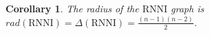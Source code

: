 \documentclass{amsart}
\newcommand{\rank}{\mathrm{rank}}
\newcommand{\nni}{\mathrm{NNI}}
\newcommand{\rnni}{\mathrm{RNNI}}
\newtheorem{lemma}[definition]{Lemma}
\newtheorem{corollary}[definition]{Corollary}
\begin{document}
\begin{corollary}
    The radius of the $\rnni$ graph is $rad(\rnni) = \Delta(\rnni) = \frac{(n-1)(n-2)}{2}$.
    \label{corollary:radius}
\end{corollary}


%
%
%
%
%
%
\end{document}
